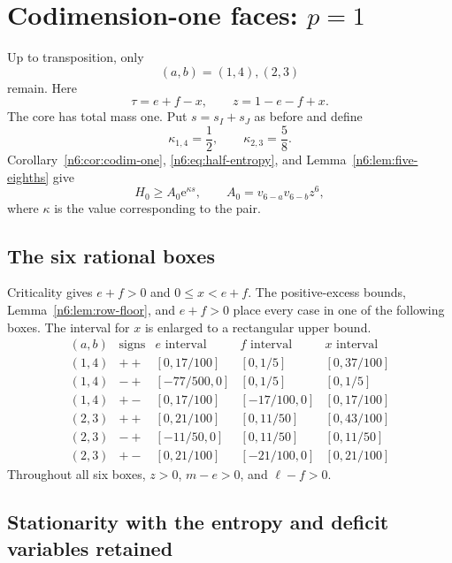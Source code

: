 \documentclass[11pt]{article}
\numberwithin{equation}{section}
\theoremstyle{definition}
\newcommand{\e}{\mathrm e}
\begin{document}
\section{Codimension-one faces: \texorpdfstring{$p=1$}{p = 1}}\label{n6:sec:p1}

Up to transposition, only
\begin{equation}
 (a,b)=(1,4),(2,3)\label{n6:eq:p1-pairs}
\end{equation}
remain.  Here
\[
 \tau=e+f-x,
 \qquad
 z=1-e-f+x.
\]
The core has total mass one.  Put $s=s_I+s_J$ as before and define
\begin{equation}
 \kappa_{1,4}=\frac12,
 \qquad
 \kappa_{2,3}=\frac58.\label{n6:eq:kappa-pairs}
\end{equation}
Corollary~\ref{n6:cor:codim-one},
\eqref{n6:eq:half-entropy}, and
Lemma~\ref{n6:lem:five-eighths} give
\begin{equation}
 H_0\ge A_0\e^{\kappa s},
 \qquad
 A_0=v_{6-a}v_{6-b}z^6,\label{n6:eq:p1-H0}
\end{equation}
where $\kappa$ is the value corresponding to the pair.

\subsection{The six rational boxes}

Criticality gives $e+f>0$ and $0\le x<e+f$.  The positive-excess bounds,
Lemma~\ref{n6:lem:row-floor}, and $e+f>0$ place every case in one of the
following boxes.  The interval for $x$ is enlarged to a rectangular upper
bound.
\begin{equation}
\begin{array}{c|c|c|c|c}
(a,b)&\text{signs}&e\text{ interval}&f\text{ interval}&x\text{ interval}\\ \hline
(1,4)&++&[0,17/100]&[0,1/5]&[0,37/100]\\
(1,4)&-+&[-77/500,0]&[0,1/5]&[0,1/5]\\
(1,4)&+-&[0,17/100]&[-17/100,0]&[0,17/100]\\
(2,3)&++&[0,21/100]&[0,11/50]&[0,43/100]\\
(2,3)&-+&[-11/50,0]&[0,11/50]&[0,11/50]\\
(2,3)&+-&[0,21/100]&[-21/100,0]&[0,21/100]
\end{array}\label{n6:eq:p1-boxes}
\end{equation}
Throughout all six boxes, $z>0$, $m-e>0$, and $\ell-f>0$.

\subsection{Stationarity with the entropy and deficit variables retained}
\end{document}
